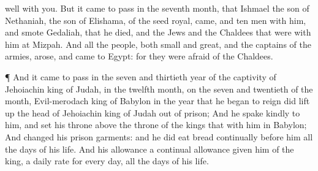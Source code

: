 {well with you.
But it came to pass in the
seventh
month, that
Ishmael the
son of
Nethaniah, the
son of
Elishama, of the
seed
royal,
came, and
ten
men with him, and
smote
Gedaliah, that he
died, and the
Jews and the
Chaldees that were with him at
Mizpah.
And all the
people, both
small and
great, and the
captains of the
armies,
arose, and
came to
Egypt: for they were
afraid
of the
Chaldees.
\par }{\PP {}¶ And it came to pass in the
seven and
thirtieth
year of the
captivity of
Jehoiachin
king of
Judah, in the
twelfth
month, on the
seven and
twentieth
{} of the
month,
{}
Evil-merodach
king of
Babylon in the
year that he began to
reign did lift
up the
head of
Jehoiachin
king of
Judah out of
prison;
And he
spake
kindly to him, and
set his
throne above the
throne of the
kings that
{} with him in
Babylon;
And
changed his
prison
garments: and he did
eat
bread
continually
before him all the
days of his
life.
And his
allowance
{} a
continual
allowance
given him of the
king, a
daily
rate for every
day, all the
days of his
life.
\par }